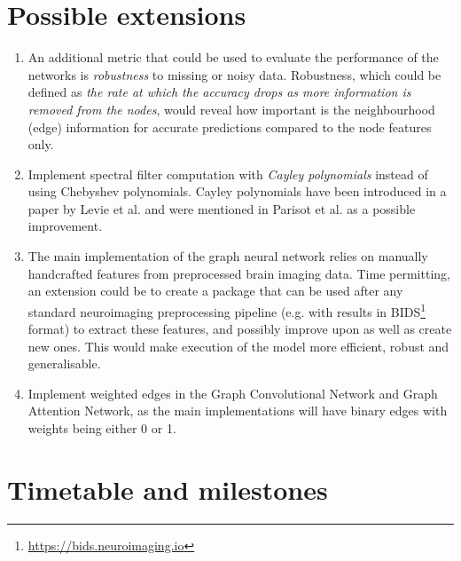\documentclass[12pt,a4paper,twoside]{article}
\begin{document}
\section*{Possible extensions}
\begin{enumerate}[label=PE\arabic*.]
  \item An additional metric that could be used to evaluate the performance of the networks is \textit{robustness} to missing or noisy data. Robustness, which could be defined as \textit{the rate at which the accuracy drops as more information is removed from the nodes}, would reveal how important is the neighbourhood (edge) information for accurate predictions compared to the node features only.
  \item Implement spectral filter computation with \textit{Cayley polynomials} instead of using Chebyshev polynomials. Cayley polynomials have been introduced in a paper by Levie et al. \cite{levie2017cayleynets} and were mentioned in Parisot et al. \cite{parisot2018disease} as a possible improvement.
  \item The main implementation of the graph neural network relies on manually handcrafted features from preprocessed brain imaging data. Time permitting, an extension could be to create a package that can be used after any standard neuroimaging preprocessing pipeline (e.g. with results in BIDS\footnote{\url{https://bids.neuroimaging.io}} format) to extract these features, and possibly improve upon as well as create new ones. This would make execution of the model more efficient, robust and generalisable.
  \item Implement weighted edges in the Graph Convolutional Network and Graph Attention Network, as the main implementations will have binary edges with weights being either 0 or 1.

\end{enumerate}


\section*{Timetable and milestones}
\label{section:timetable}
\end{document}
